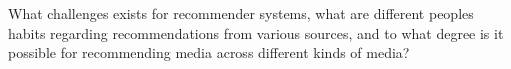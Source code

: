 What challenges exists for recommender systems, what are different peoples habits regarding recommendations from various sources, and to what degree is it possible for recommending media across different kinds of media?